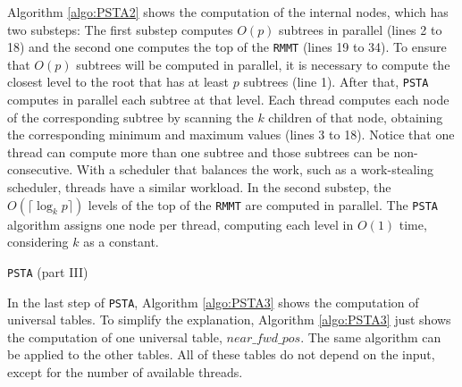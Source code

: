 Algorithm \ref{algo:PSTA2} shows the computation of the internal
nodes, which has two substeps: The first substep computes $O(p)$
subtrees in parallel (lines 2 to 18) and the second one computes the
top of the {\tt RMMT} (lines 19 to 34). To ensure that $O(p)$ subtrees
will be computed in parallel, it is necessary to compute the closest
level to the root that has at least $p$ subtrees (line 1). After that,
{\tt PSTA} computes in parallel each subtree at that level. Each
thread computes each node of the corresponding subtree by scanning the
$k$ children of that node, obtaining the corresponding minimum and
maximum values (lines 3 to 18). Notice that one thread can compute
more than one subtree and those subtrees can be non-consecutive. With
a scheduler that balances the work, such as a work-stealing scheduler,
threads have a similar workload. In the second substep, the $O(\lceil
\log_{k}p \rceil)$ levels of the top of the {\tt RMMT} are computed in
parallel. The {\tt PSTA} algorithm assigns one node per thread,
computing each level in $O(1)$ time, considering $k$ as a constant.


\begin{algorithm}[t]
\small
\SetVlineSkip{-2cm}
  \LinesNumbered
  \SetAlgoNoEnd
  \DontPrintSemicolon
  \BlankLine%


  \caption{{\tt PSTA} (part III)}
  \label{algo:PSTA3}
\end{algorithm}
\normalsize

In the last step of {\tt PSTA}, Algorithm \ref{algo:PSTA3} shows the computation of
universal tables. To simplify the explanation, Algorithm
\ref{algo:PSTA3} just shows the computation of one universal table,
$near\_fwd\_pos$. The same algorithm can be applied to the other
tables. All of these tables do not depend on the input, except for the
number of available threads.


